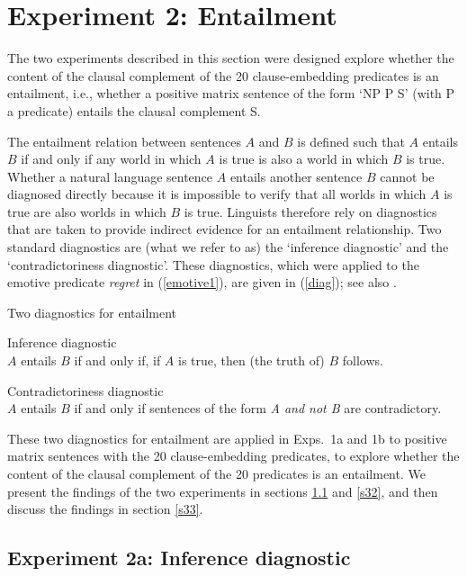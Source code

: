 \documentclass[11pt,fleqn]{article}
\newcommand{\6}{\mbox{$[\hspace*{-.6mm}[$}}
\newcommand{\9}{\mbox{$]\hspace*{-.6mm}]$}}
\begin{document}
\section{Experiment 2: Entailment}\label{s3}

The two experiments described in this section were designed explore whether the content of the clausal complement of the 20 clause-embedding predicates is an entailment, i.e., whether a positive matrix sentence of the form `NP P S' (with P a predicate) entails the clausal complement S. 

The entailment relation between sentences $A$ and $B$ is defined such that $A$ entails $B$ if and only if any world in which $A$ is true is also a world in which $B$ is true. Whether a natural language sentence $A$ entails another sentence $B$ cannot be diagnosed directly because it is impossible to verify that all worlds in which $A$ is true are also worlds in which $B$ is true. Linguists therefore rely on diagnostics that are taken to provide indirect evidence for an entailment relationship. Two standard diagnostics are (what we refer to as) the `inference diagnostic' and the `contradictoriness diagnostic'. These diagnostics, which were applied to the emotive predicate {\em regret} in (\ref{emotive1}), are given in (\ref{diag}); see also \citealt[\S3.1]{ccmg90}.

\begin{exe}
\ex\label{diag} Two diagnostics for entailment
\begin{xlist}
\ex  Inference diagnostic \\ $A$ entails $B$ if and only if, if $A$ is true, then (the truth of) $B$ follows. 

\ex  Contradictoriness diagnostic \\ $A$ entails $B$ if and only if sentences of the form {\em A and not B} are contradictory. 

\end{xlist}
\end{exe}
These two diagnostics for entailment are applied in Exps.~1a and 1b to positive matrix sentences with the 20 clause-embedding predicates, to explore whether the content of the clausal complement of the 20 predicates is an entailment. We present the findings of the two experiments in sections \ref{s31} and \ref{s32}, and then discuss the findings in section \ref{s33}.

\subsection{Experiment 2a: Inference diagnostic}\label{s31}
\end{document}
